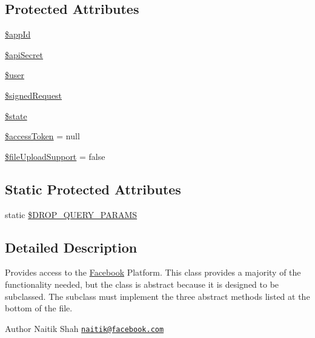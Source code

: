 \subsection*{Protected Attributes}
\begin{DoxyCompactItemize}
\item 
\hyperlink{class_base_facebook_a37486f0bbe35e62c5ba1e129441b6ac6}{\$app\-Id}
\item 
\hyperlink{class_base_facebook_a50879f00927b420efd4a5e1f495a423d}{\$api\-Secret}
\item 
\hyperlink{class_base_facebook_a598ca4e71b15a1313ec95f0df1027ca5}{\$user}
\item 
\hyperlink{class_base_facebook_a431a801575d1145d1a9621e7fd176ed9}{\$signed\-Request}
\item 
\hyperlink{class_base_facebook_ae82306c4f2d17d8dd5c7d8d916b33bed}{\$state}
\item 
\hyperlink{class_base_facebook_a14696362b35353b3280dfbec3f88861d}{\$access\-Token} = null
\item 
\hyperlink{class_base_facebook_a06aa2734d6a181d46ea99b3122015d83}{\$file\-Upload\-Support} = false
\end{DoxyCompactItemize}
\subsection*{Static Protected Attributes}
\begin{DoxyCompactItemize}
\item 
static \hyperlink{class_base_facebook_a4a197673d978b05709df6e2240e545c6}{\$\-D\-R\-O\-P\-\_\-\-Q\-U\-E\-R\-Y\-\_\-\-P\-A\-R\-A\-M\-S}
\end{DoxyCompactItemize}


\subsection{Detailed Description}
Provides access to the \hyperlink{class_facebook}{Facebook} Platform. This class provides a majority of the functionality needed, but the class is abstract because it is designed to be subclassed. The subclass must implement the three abstract methods listed at the bottom of the file.

\begin{DoxyAuthor}{Author}
Naitik Shah \href{mailto:naitik@facebook.com}{\tt naitik@facebook.\-com} 
\end{DoxyAuthor}


